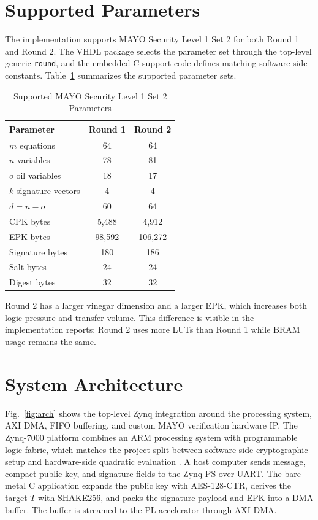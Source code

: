\documentclass[conference]{IEEEtran}
\begin{document}
\section{Supported Parameters}
The implementation supports MAYO Security Level 1 Set 2 for both Round 1 and Round 2. The VHDL package selects the parameter set through the top-level generic \texttt{round}, and the embedded C support code defines matching software-side constants. Table~\ref{tab:params} summarizes the supported parameter sets.

\begin{table}[t]
\centering
\caption{Supported MAYO Security Level 1 Set 2 Parameters}
\label{tab:params}
\begin{tabular}{lcc}
\toprule
Parameter & Round 1 & Round 2 \\
\midrule
\(m\) equations & 64 & 64 \\
\(n\) variables & 78 & 81 \\
\(o\) oil variables & 18 & 17 \\
\(k\) signature vectors & 4 & 4 \\
\(d=n-o\) & 60 & 64 \\
CPK bytes & 5,488 & 4,912 \\
EPK bytes & 98,592 & 106,272 \\
Signature bytes & 180 & 186 \\
Salt bytes & 24 & 24 \\
Digest bytes & 32 & 32 \\
\bottomrule
\end{tabular}
\end{table}

Round 2 has a larger vinegar dimension and a larger EPK, which increases both logic pressure and transfer volume. This difference is visible in the implementation reports: Round 2 uses more LUTs than Round 1 while BRAM usage remains the same.

\section{System Architecture}
Fig.~\ref{fig:arch} shows the top-level Zynq integration around the processing system, AXI DMA, FIFO buffering, and custom MAYO verification hardware IP. The Zynq-7000 platform combines an ARM processing system with programmable logic fabric, which matches the project split between software-side cryptographic setup and hardware-side quadratic evaluation \cite{xilinxzynq}. A host computer sends message, compact public key, and signature fields to the Zynq PS over UART. The bare-metal C application expands the public key with AES-128-CTR, derives the target \(T\) with SHAKE256, and packs the signature payload and EPK into a DMA buffer. The buffer is streamed to the PL accelerator through AXI DMA.
\end{document}
